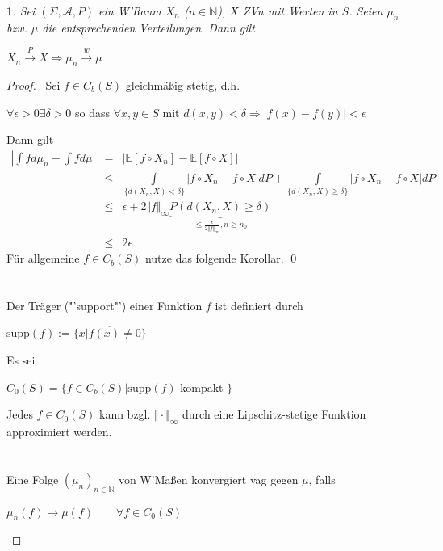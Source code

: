 \documentclass[10pt,a4paper]{report}
\newcommand{\E}{\mathbb{E}}
\newcommand{\N}{\mathbb{N}}
\newcommand{\supp}{\text{supp}}
\numberwithin{equation}{section}
\numberwithin{figure}{section}
\theoremstyle{plain}
\theoremstyle{definition}
\theoremstyle{remark}
\theoremstyle{plain}
\newtheorem{cor}[thm]{\protect\corollaryname}
\providecommand{\corollaryname}{Korollar}
\newcommand{\1}{ \mathbb{1} } %
\begin{document}
\begin{cor}
  Sei $(\Sigma,\mathcal{A},P)$ ein W'Raum $X_n$ ($n \in \N$), $X$ ZVn
  mit Werten in $S$. Seien $\mu_n$ bzw. $\mu$ die entsprechenden
  Verteilungen. Dann gilt
  \begin{center}
    $X_n \overset{P}{\to} X \Rightarrow \mu_n \overset{w}{\to} \mu$
  \end{center}
\end{cor}
\begin{proof} \ 
  Sei $f \in C_b(S)$ gleichmäßig stetig, d.h.
  \begin{center}
    $\forall \epsilon>0 \exists \delta>0$ so dass $\forall x,y \in S$
    mit $ d(x,y)<\delta \Rightarrow |f(x)-f(y)|<\epsilon$
  \end{center}
  Dann gilt
  \begin{eqnarray*}
    \left|\int fd\mu_n-\int fd\mu\right| &=& |\E[f\circ X_n]-\E[f\circ X]|\\
    &\leq & \int\limits_{\{d(X_n,X)<\delta\}} |f\circ X_n-f\circ X|dP+\int\limits_{\{d(X_n,X)\geq\delta\}} |f\circ X_n-f\circ X|dP\\
    &\leq & \epsilon + 2\Vert f\Vert_\infty \underbrace{P(d(X_n,X)\geq \delta)}_{\leq \frac{\epsilon}{2\Vert f\Vert_\infty}, n \geq n_0}\\
    &\leq & 2\epsilon
  \end{eqnarray*}
  Für allgemeine $f \in C_b(S)$ nutze das folgende Korollar. \qed\\\\\\
  Der Träger ("'support"') einer Funktion $f$ ist definiert durch
  \begin{center}
    $\supp(f):=\overline{\{x|f(x)\neq 0\}}$
  \end{center}
  Es sei
  \begin{center}
    $C_0(S)=\{f \in C_b(S)|\supp(f) $ kompakt $\}$
  \end{center}
  Jedes $f \in C_0(S)$ kann bzgl. $\Vert \cdot \Vert_\infty$ durch eine Lipschitz-stetige Funktion approximiert werden.\\\\\\
  Eine Folge $(\mu_n)_{n \in \N}$ von W'Maßen konvergiert vag gegen
  $\mu$, falls
  \begin{center}
    $\mu_n(f) \to \mu(f) \qquad \forall f \in C_0(S)$
  \end{center}
\end{proof}
\end{document}
